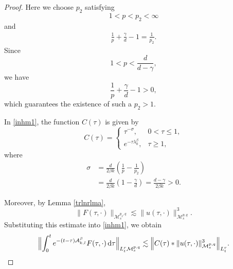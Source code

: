 \documentclass[12pt,reqno,a4paper]{amsart}
\numberwithin{equation}{section}
\theoremstyle{plain}
\theoremstyle{definition}
\theoremstyle{remark}
\def\M{\mathcal{M}}
\def \Ad{\mathcal{A}_{k,l}}
\def \M{{\mathcal M}}
\begin{document}
\begin{proof}
Here we choose $p_{2}$ satisfying
\[
1<p<p_{2}<\infty
\]
and
\begin{align}
\label{enq}
\frac{1}{p}+\frac{\gamma}{d}-1
=
\frac{1}{p_{2}}.
\end{align}
Since
\[
1<p<\frac{d}{d-\gamma},
\]
we have
\[
\frac{1}{p}+\frac{\gamma}{d}-1>0,
\]
which guarantees the existence of such a $p_{2}>1$.

In \eqref{inhm1}, the function $C(\tau)$ is given by
\[
C(\tau)=
\begin{cases}
\tau^{-\sigma}, & 0<\tau\leq 1,\\[0.3em]
e^{-\tau\lambda_{0}^{\beta}}, & \tau\geq 1,
\end{cases}
\]
where
\begin{align}
\label{sigma1}
\sigma
&=
\frac{d}{2\beta k}
\left(\frac{1}{p}-\frac{1}{p_{2}}\right) \nonumber\\
&=
\frac{d}{2\beta k}
\left(1-\frac{\gamma}{d}\right)
=
\frac{d-\gamma}{2\beta k}
>0.
\end{align}

Moreover, by Lemma \ref{trlnrlma},
\[
\|F(\tau,\cdot)\|_{\M^{p_{2},q}_{s}}
\lesssim
\|u(\tau,\cdot)\|_{\M^{p,q}_{s}}^{3}.
\]
Substituting this estimate into \eqref{inhm1}, we obtain
\[
\Bigl\|
\int_{0}^{t}
e^{-(t-\tau)\Ad^{\beta}}
F(\tau,\cdot)\,\mathrm{d}\tau
\Bigr\|_{L^{r}_{t}\M^{p,q}_{s}}
\lesssim
\Bigl\|
C(\tau)
*
\|u(\tau,\cdot)\|_{\M^{p,q}_{s}}^{3}
\Bigr\|_{L^{r}_{t}}.
\]


\end{proof}
\end{document}
